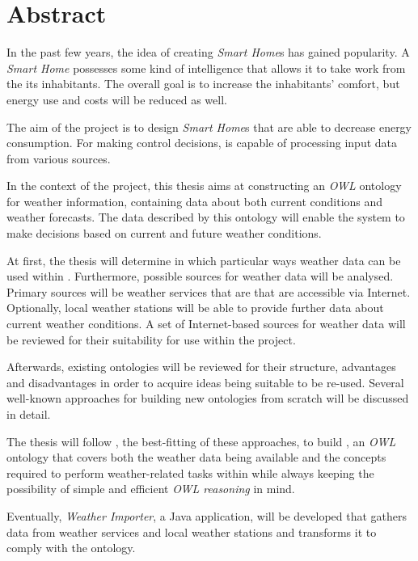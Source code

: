 \chapter*{Abstract}

In the past few years, the idea of creating \emph{Smart Home}s has gained popularity. A \emph{Smart Home} possesses some kind of intelligence that allows it to take work from the its inhabitants. The overall goal is to increase the inhabitants' comfort, but energy use and costs will be reduced as well.

The aim of the \thinkhome project is to design \emph{Smart Home}s that are able to decrease energy consumption. For making control decisions, \thinkhome is capable of processing input data from various sources.

In the context of the \thinkhome project, this thesis aims at constructing an \emph{OWL} ontology for weather information, containing data about both current conditions and weather forecasts. The data described by this ontology will enable the \thinkhome system to make decisions based on current and future weather conditions.

At first, the thesis will determine in which particular ways weather data can be used within \thinkhome. Furthermore, possible sources for weather data will be analysed. Primary sources will be weather services that are that are accessible via Internet. Optionally, local weather stations will be able to provide further data about current weather conditions. A set of Internet-based sources for weather data will be reviewed for their suitability for use within the \thinkhome project.

Afterwards, existing ontologies will be reviewed for their structure, advantages and disadvantages in order to acquire ideas being suitable to be re-used. Several well-known approaches for building new ontologies from scratch will be discussed in detail.

The thesis will follow \methontology, the best-fitting of these approaches, to build \thinkhomeweather, an \textit{OWL} ontology that covers both the weather data being available and the concepts required to perform weather-related tasks within \thinkhome while always keeping the possibility of simple and efficient \textit{OWL reasoning} in mind.

Eventually, \emph{Weather Importer}, a Java application, will be developed that gathers data from weather services and local weather stations and transforms it to comply with the \thinkhomeweather ontology.
